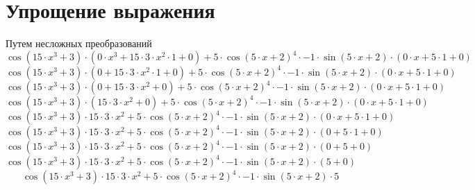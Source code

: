 \documentclass[12pt, a4paper]{report}
\begin{document}
\section{Упрощение выражения}
Путем несложных преобразований
\begin{dmath*}
\cos{(15 \cdot  x  ^ {3} + 3)} \cdot  ( 0 \cdot  x  ^ {3} + 15 \cdot 3 \cdot  x  ^ {2} \cdot 1 + 0 )  + 5 \cdot \cos{(5 \cdot  x  + 2)} ^ {4} \cdot -1 \cdot \sin{(5 \cdot  x  + 2)} \cdot  ( 0 \cdot  x  + 5 \cdot 1 + 0 ) \end{dmath*}
\begin{dmath*}
\cos{(15 \cdot  x  ^ {3} + 3)} \cdot  ( 0 + 15 \cdot 3 \cdot  x  ^ {2} \cdot 1 + 0 )  + 5 \cdot \cos{(5 \cdot  x  + 2)} ^ {4} \cdot -1 \cdot \sin{(5 \cdot  x  + 2)} \cdot  ( 0 \cdot  x  + 5 \cdot 1 + 0 ) \end{dmath*}
\begin{dmath*}
\cos{(15 \cdot  x  ^ {3} + 3)} \cdot  ( 0 + 15 \cdot 3 \cdot  x  ^ {2} + 0 )  + 5 \cdot \cos{(5 \cdot  x  + 2)} ^ {4} \cdot -1 \cdot \sin{(5 \cdot  x  + 2)} \cdot  ( 0 \cdot  x  + 5 \cdot 1 + 0 ) \end{dmath*}
\begin{dmath*}
\cos{(15 \cdot  x  ^ {3} + 3)} \cdot  ( 15 \cdot 3 \cdot  x  ^ {2} + 0 )  + 5 \cdot \cos{(5 \cdot  x  + 2)} ^ {4} \cdot -1 \cdot \sin{(5 \cdot  x  + 2)} \cdot  ( 0 \cdot  x  + 5 \cdot 1 + 0 ) \end{dmath*}
\begin{dmath*}
\cos{(15 \cdot  x  ^ {3} + 3)} \cdot 15 \cdot 3 \cdot  x  ^ {2} + 5 \cdot \cos{(5 \cdot  x  + 2)} ^ {4} \cdot -1 \cdot \sin{(5 \cdot  x  + 2)} \cdot  ( 0 \cdot  x  + 5 \cdot 1 + 0 ) \end{dmath*}
\begin{dmath*}
\cos{(15 \cdot  x  ^ {3} + 3)} \cdot 15 \cdot 3 \cdot  x  ^ {2} + 5 \cdot \cos{(5 \cdot  x  + 2)} ^ {4} \cdot -1 \cdot \sin{(5 \cdot  x  + 2)} \cdot  ( 0 + 5 \cdot 1 + 0 ) \end{dmath*}
\begin{dmath*}
\cos{(15 \cdot  x  ^ {3} + 3)} \cdot 15 \cdot 3 \cdot  x  ^ {2} + 5 \cdot \cos{(5 \cdot  x  + 2)} ^ {4} \cdot -1 \cdot \sin{(5 \cdot  x  + 2)} \cdot  ( 0 + 5 + 0 ) \end{dmath*}
\begin{dmath*}
\cos{(15 \cdot  x  ^ {3} + 3)} \cdot 15 \cdot 3 \cdot  x  ^ {2} + 5 \cdot \cos{(5 \cdot  x  + 2)} ^ {4} \cdot -1 \cdot \sin{(5 \cdot  x  + 2)} \cdot  ( 5 + 0 ) \end{dmath*}
\begin{dmath*}
\cos{(15 \cdot  x  ^ {3} + 3)} \cdot 15 \cdot 3 \cdot  x  ^ {2} + 5 \cdot \cos{(5 \cdot  x  + 2)} ^ {4} \cdot -1 \cdot \sin{(5 \cdot  x  + 2)} \cdot 5\end{dmath*}
\end{document}

